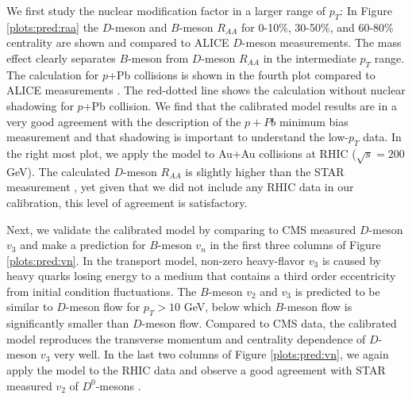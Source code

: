 \documentclass[aps, prc, reprint, amsmath, groupedaddress, nofootinbib]{revtex4-1}
\begin{document}
We first study the nuclear modification factor in a larger range of $p_T$:
In Figure \ref{plots:pred:raa} the $D$-meson and $B$-meson $R_{AA}$ for 0-10\%, 30-50\%, and 60-80\% centrality are shown and compared to ALICE $D$-meson measurements.
The mass effect clearly separates $B$-meson from $D$-meson $R_{AA}$ in the intermediate $p_T$ range. 
The calculation for $p$+Pb collisions is shown in the fourth plot compared to ALICE measurements \cite{Abelev:2014hha}.
The red-dotted line shows the calculation without nuclear shadowing for $p$+Pb collision.
We find that the calibrated model results are in a very good agreement with the description of the $p+Pb$ minimum bias measurement and that shadowing  is important to understand the low-$p_T$ data.
In the right most plot, we apply the model to Au+Au collisions at RHIC  ($\sqrt{s} = 200$ GeV).
The calculated $D$-meson $R_{AA}$ is slightly higher than the STAR measurement \cite{Xie:2016iwq}, 
yet given that we did not include any RHIC data in our calibration, this level of agreement is satisfactory.

Next, we validate the calibrated model by comparing to CMS measured $D$-meson $v_3$ and make a prediction for $B$-meson $v_n$ in the first three columns of Figure \ref{plots:pred:vn}.
In the transport model, non-zero heavy-flavor $v_3$ is caused by heavy quarks losing energy to a medium that contains a third order eccentricity from initial condition fluctuations.
The $B$-meson $v_2$ and $v_3$ is predicted to be similar to $D$-meson flow for $p_T > 10$ GeV, below which $B$-meson flow is significantly smaller than $D$-meson flow.
Compared to CMS data, the calibrated model reproduces the transverse momentum and centrality dependence of $D$-meson $v_3$ very well.
In the last two columns of Figure \ref{plots:pred:vn}, we again apply the model to the RHIC data and observe a good agreement with STAR measured $v_2$ of $D^0$-mesons \cite{Adamczyk:2017xur}.
\end{document}

